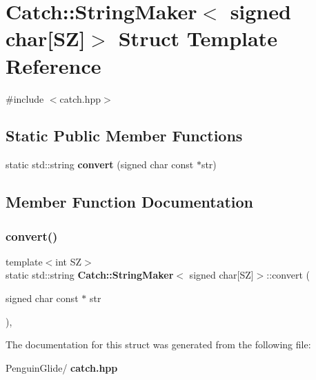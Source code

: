 \section{Catch\+::String\+Maker$<$ signed char[SZ]$>$ Struct Template Reference}
\label{struct_catch_1_1_string_maker_3_01signed_01char[_s_z]_4}


{\ttfamily \#include $<$catch.\+hpp$>$}

\subsection*{Static Public Member Functions}
\begin{DoxyCompactItemize}
\item 
static std\+::string \textbf{ convert} (signed char const $\ast$str)
\end{DoxyCompactItemize}


\subsection{Member Function Documentation}
\mbox{\label{struct_catch_1_1_string_maker_3_01signed_01char[_s_z]_4_a23ac689cc79dbcfe9b1765fe9e25690e}} 
\subsubsection{convert()}
{\footnotesize\ttfamily template$<$int SZ$>$ \\
static std\+::string \textbf{ Catch\+::\+String\+Maker}$<$ signed char[SZ]$>$\+::convert (\begin{DoxyParamCaption}\item[{signed char const $\ast$}]{str }\end{DoxyParamCaption})\hspace{0.3cm}{\ttfamily [inline]}, {\ttfamily [static]}}



The documentation for this struct was generated from the following file\+:\begin{DoxyCompactItemize}
\item 
Penguin\+Glide/\textbf{ catch.\+hpp}\end{DoxyCompactItemize}
